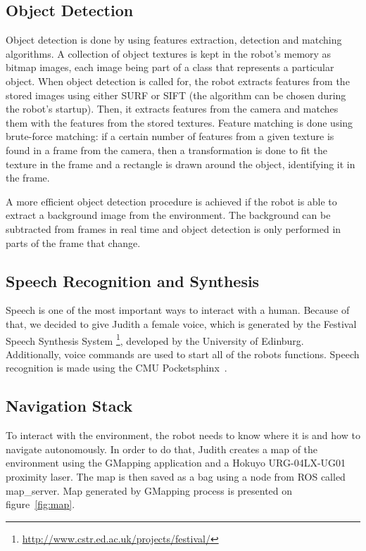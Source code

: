 \subsection{Object Detection}\label{object-detection}
Object detection is done by using features extraction, detection and matching algorithms. A collection of object textures is kept in the robot's memory as bitmap images, each image being part of a class that represents a particular object. When object detection is called for, the robot extracts features from the stored images using either SURF \cite{bay_speeded-up_2008} or SIFT \cite{lowe_object_1999} (the algorithm can be chosen during the robot's startup). Then, it extracts features from the camera and matches them with the features from the stored textures. Feature matching is done using brute-force matching: if a certain number of features from a given texture is found in a frame from the camera, then a transformation is done to fit the texture in the frame and a rectangle is drawn around the object, identifying it in the frame.

A more efficient object detection procedure is achieved if the robot is able to extract a background image from the environment. The background can be subtracted from frames in real time and object detection is only performed in parts of the frame that change.

\subsection{Speech Recognition and Synthesis}\label{speech}
Speech is one of the most important ways to interact with a human. Because of that, we decided to give Judith a female voice, which is generated by the Festival Speech Synthesis System \footnote{\url{http://www.cstr.ed.ac.uk/projects/festival/}}, developed by the University of Edinburg. Additionally, voice commands are used to start all of the robots functions. Speech recognition is made using the CMU Pocketsphinx~\cite{huggins:2006}.

\subsection{Navigation Stack}\label{navigation}
To interact with the environment, the robot needs to know where it is and how to navigate autonomously. In order to do that, Judith creates a map of the environment using the GMapping application and a Hokuyo URG-04LX-UG01 proximity laser. The map is then saved as a bag using a node from ROS called map\_server. Map generated by GMapping process is presented on figure~\ref{fig:map}.

